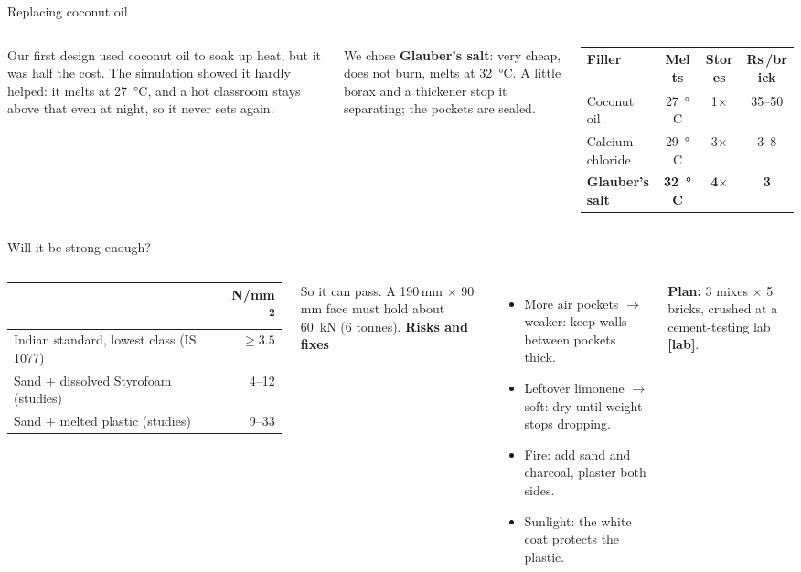 \documentclass[aspectratio=169,10pt]{beamer}
\newcommand{\todo}[1]{\textcolor{heat}{\textbf{[#1]}}}
\newcommand{\rupeesym}{Rs\,}
\begin{document}
\begin{frame}{Replacing coconut oil}
\begin{columns}[T]
Our first design used coconut oil to soak up heat, but it was half the cost. The simulation showed it hardly helped: it melts at \SI{27}{\celsius}, and a hot classroom stays above that even at night, so it never sets again.

\medskip
We chose \textbf{Glauber's salt}: very cheap, does not burn, melts at \SI{32}{\celsius}. A little borax and a thickener stop it separating; the pockets are sealed.
\small
\begin{tabular}{@{}lccc@{}}
\toprule
Filler & Melts & Stores & \rupeesym/brick \\
\midrule
Coconut oil & \SI{27}{\celsius} & 1$\times$ & 35--50 \\
Calcium chloride & \SI{29}{\celsius} & 3$\times$ & 3--8 \\
\textbf{Glauber's salt} & \textbf{\SI{32}{\celsius}} & \textbf{4$\times$} & \textbf{3} \\
\bottomrule
\end{tabular}
\end{columns}
\end{frame}

\begin{frame}{Will it be strong enough?}
\begin{columns}[T]
\small
\begin{tabular}{@{}lr@{}}
\toprule
 & N/mm\textsuperscript{2} \\
\midrule
Indian standard, lowest class (IS 1077) & $\ge 3.5$ \\
Sand + dissolved Styrofoam (studies) & 4--12 \\
Sand + melted plastic (studies) & 9--33 \\
\bottomrule
\end{tabular}

\medskip
So it can pass. A 190\,mm $\times$ 90\,mm face must hold about \SI{60}{kN} (6 tonnes).
\small
\textbf{Risks and fixes}
\begin{itemize}
  \item More air pockets $\rightarrow$ weaker: keep walls between pockets thick.
  \item Leftover limonene $\rightarrow$ soft: dry until weight stops dropping.
  \item Fire: add sand and charcoal, plaster both sides.
  \item Sunlight: the white coat protects the plastic.
\end{itemize}
\textbf{Plan:} 3 mixes $\times$ 5 bricks, crushed at a cement-testing lab \todo{lab}.
\end{columns}
\end{frame}
\end{document}
